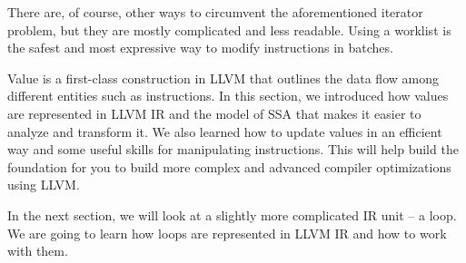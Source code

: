 There are, of course, other ways to circumvent the aforementioned iterator problem, but they are mostly complicated and less readable. Using a worklist is the safest and most expressive way to modify instructions in batches.

Value is a first-class construction in LLVM that outlines the data flow among different entities such as instructions. In this section, we introduced how values are represented in LLVM IR and the model of SSA that makes it easier to analyze and transform it. We also learned how to update values in an efficient way and some useful skills for manipulating instructions. This will help build the foundation for you to build more complex and advanced compiler optimizations using LLVM.

In the next section, we will look at a slightly more complicated IR unit – a loop. We are going to learn how loops are represented in LLVM IR and how to work with them.




















